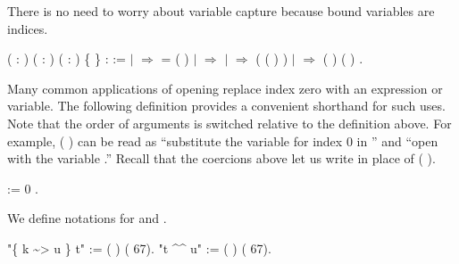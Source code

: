 \documentclass[12pt]{report}
\begin{document}
    There is no need to worry about variable capture because bound
    variables are indices.
\begin{coqdoccode}
\coqdocemptyline
\coqdocnoindent
{}  ( : ) ( : ) ( : ) \{ \} :  :=\coqdoceol
\coqdocindent{1.00em}
  \coqdoceol
\coqdocindent{1.00em}
\ensuremath{|}      \ensuremath{\Rightarrow}   =     ( )\coqdoceol
\coqdocindent{1.00em}
\ensuremath{|}      \ensuremath{\Rightarrow}  \coqdoceol
\coqdocindent{1.00em}
\ensuremath{|}      \ensuremath{\Rightarrow}  ( ( )  )\coqdoceol
\coqdocindent{1.00em}
\ensuremath{|}    \ensuremath{\Rightarrow}  (   ) (   )\coqdoceol
\coqdocindent{1.00em}
.\coqdoceol
\coqdocemptyline
\end{coqdoccode}
Many common applications of opening replace index zero with an
    expression or variable.  The following definition provides a
    convenient shorthand for such uses.  Note that the order of
    arguments is switched relative to the definition above.  For
    example, (  ) can be read as ``substitute the variable 
    for index 0 in '' and ``open  with the variable .''
    Recall that the coercions above let us write  in place of
    ( ).
\begin{coqdoccode}
\coqdocemptyline
\coqdocnoindent
{}    :=  0  .\coqdoceol
\coqdocemptyline
\end{coqdoccode}
We define notations for  and . \begin{coqdoccode}
\coqdocemptyline
\coqdocnoindent
{} "\{ k \~{}> u \} t" := (   ) (  67).\coqdoceol
\coqdocnoindent
{} "t \^{}\^{} u" := (  ) (  67).\coqdoceol
\coqdocemptyline
\end{coqdoccode}
\end{document}
